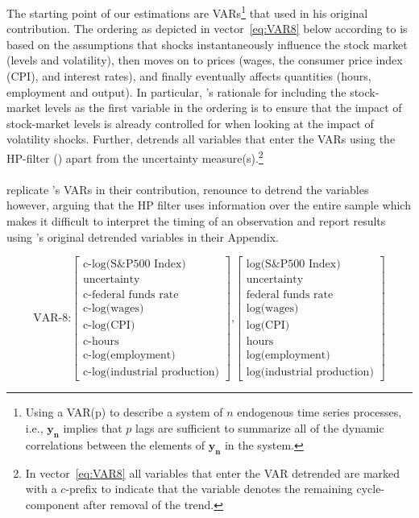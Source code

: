 \documentclass[a4paper,11pt,listof=nochaptergap,oneside,pointednumbers,bibtotoc,bigheadings,liststotoc]{scrbook}
\newcommand{\vect}[1]{\boldsymbol{\mathbf{#1}}}
\begin{document}
The starting point of our estimations are VARs\footnote{Using a VAR(p) to describe a system of $n$ endogenous time series processes, i.e., $\vect{y_n}$ implies that $p$ lags are sufficient to summarize all of the dynamic correlations between the elements of $\vect{y_n}$ in the system.} that \citet{bloom:09} used in his original contribution. The ordering as depicted in vector~\ref{eq:VAR8} below according to \citet[p. 630]{bloom:09} is based on the assumptions that shocks instantaneously influence the stock market (levels and volatility), then moves on to prices (wages, the consumer price index (CPI), and interest rates), and finally eventually affects quantities (hours, employment and output). In particular, \citet{bloom:09}'s rationale for including the stock-market levels as the first variable in the ordering is to ensure that the impact of stock-market levels is already controlled for when looking at the impact of volatility shocks. Further, \citet{bloom:09} detrends all variables that enter the VARs using the HP-filter (\citealp{hodrickandprescott:97}) apart from the uncertainty measure(s).\footnote{In vector~\ref{eq:VAR8} all variables that enter the VAR detrended are marked with a $c$-prefix to indicate that the variable denotes the remaining cycle-component after removal of the trend.}\\
\\
\citet{juradoetal:15} replicate \citet{bloom:09}'s VARs in their contribution, renounce to detrend the variables however, arguing that the HP filter uses information over the entire sample which makes it difficult to interpret the timing of an observation and report results using \citet{bloom:09}'s original detrended variables in their Appendix. 

\begin{equation} \label{eq:VAR8}
\text{VAR-8:} \begin{bmatrix} \text{c-log(S\&P500 Index)} \\ 
				      \text{uncertainty}\\ 
				      \text{c-federal funds rate}\\
				      \text{c-log(wages)}\\
				      \text{c-log(CPI)}\\
				      \text{c-hours}\\
				      \text{c-log(employment)}\\
				      \text{c-log(industrial production)}
	      \end{bmatrix}\text{,}
	      \begin{bmatrix} \text{log(S\&P500 Index)} \\ 
				      \text{uncertainty}\\ 
				      \text{federal funds rate}\\
				      \text{log(wages)}\\
				      \text{log(CPI)}\\
				      \text{hours}\\
				      \text{log(employment)}\\
				      \text{log(industrial production)}
	      \end{bmatrix}
\end{equation}
\end{document}
